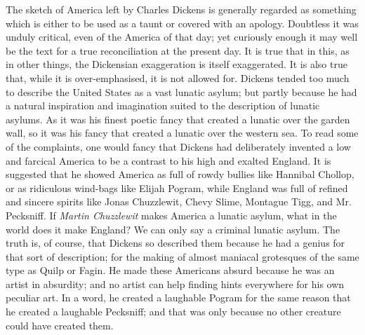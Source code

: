 \documentclass{book}
\begin{document}
The sketch of America left by Charles Dickens is generally regarded as something which is either to be used as a taunt or covered with an apology. Doubtless it was unduly critical, even of the America of that day; yet curiously enough it may well be the text for a true reconciliation at the present day. It is true that in this, as in other things, the Dickensian exaggeration is itself exaggerated. It is also true that, while it is over-emphasised, it is not allowed for. Dickens tended too much to describe the United States as a vast lunatic asylum; but partly because he had a natural inspiration and imagination suited to the description of lunatic asylums. As it was his finest poetic fancy that created a lunatic over the garden wall, so it was his fancy that created a lunatic over the western sea. To read some of the complaints, one would fancy that Dickens had deliberately invented a low and farcical America to be a contrast to his high and exalted England. It is suggested that he showed America as full of rowdy bullies like Hannibal Chollop, or as ridiculous wind-bags like Elijah Pogram, while England was full of refined and sincere spirits like Jonas Chuzzlewit, Chevy Slime, Montague Tigg, and Mr. Pecksniff. If \emph{Martin Chuzzlewit} makes America a lunatic asylum, what in the world does it make England? We can only say a criminal lunatic asylum. The truth is, of course, that Dickens so described them because he had a genius for that sort of description; for the making of almost maniacal grotesques of the same type as Quilp or Fagin. He made these Americans absurd because he was an artist in absurdity; and no artist can help finding hints everywhere for his own peculiar art. In a word, he created a laughable Pogram for the same reason that he created a laughable Pecksniff; and that was only because no other creature could have created them.
\end{document}

